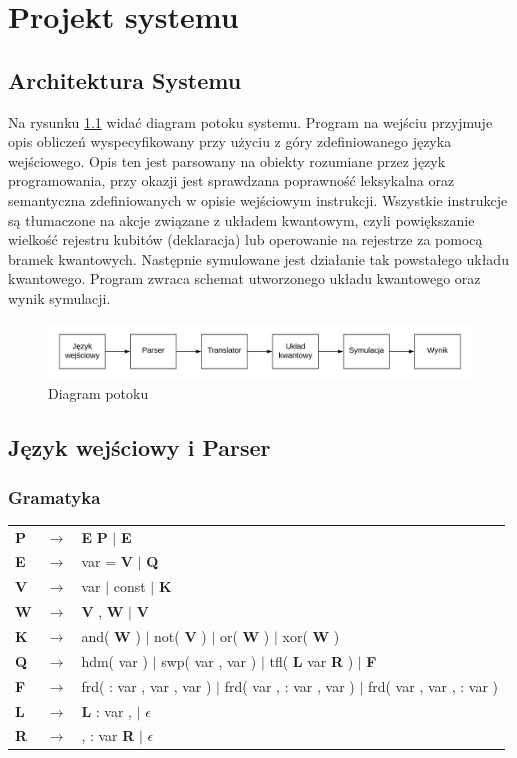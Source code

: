 \chapter{Projekt systemu}
\thispagestyle{chapterBeginStyle}
\label{rozdzial2}

\section{Architektura Systemu}
Na rysunku \ref{fig:potok} widać diagram potoku systemu. Program na wejściu przyjmuje opis obliczeń wyspecyfikowany przy użyciu z góry zdefiniowanego języka wejściowego. Opis ten jest parsowany na obiekty rozumiane przez język programowania, przy okazji jest sprawdzana poprawność leksykalna oraz semantyczna zdefiniowanych w opisie wejściowym instrukcji. Wszystkie instrukcje są tłumaczone na akcje związane z układem kwantowym, czyli powiększanie wielkość rejestru kubitów (deklaracja) lub operowanie na rejestrze za pomocą bramek kwantowych. Następnie symulowane jest działanie tak powstałego układu kwantowego. Program zwraca schemat utworzonego układu kwantowego oraz wynik symulacji.
\begin{figure}[H]
    \includegraphics[width=\linewidth]{systemDiag.png}
    \caption{Diagram potoku}
    \label{fig:potok}
\end{figure}
\section{Język wejściowy i Parser}
\subsection{Gramatyka}
\begin{tabular}{ l c l } 
    \textbf{P} & $\rightarrow$ & \textbf{E} \textbf{P} $|$ \textbf{E} \\ 
    \textbf{E} & $\rightarrow$ & var = \textbf{V} $|$ \textbf{Q} \\ 
    \textbf{V} & $\rightarrow$ & var $|$ const $|$ \textbf{K} \\ 
    \textbf{W} & $\rightarrow$ & \textbf{V} , \textbf{W} $|$ \textbf{V} \\
    \textbf{K} & $\rightarrow$ & and( \textbf{W} ) $|$ not( \textbf{V} ) $|$ or( \textbf{W} ) $|$ xor( \textbf{W} )\\
    \textbf{Q} & $\rightarrow$ & hdm( var ) $|$ swp( var , var ) $|$ tfl( \textbf{L} var \textbf{R} ) $|$ \textbf{F}\\
    \textbf{F} & $\rightarrow$ & frd( : var , var , var ) $|$ frd( var , : var , var ) $|$ frd( var , var , : var )\\
    \textbf{L} & $\rightarrow$ & \textbf{L} : var , $|$ $\epsilon$\\
    \textbf{R} & $\rightarrow$ & , : var \textbf{R} $|$ $\epsilon$\\
\end{tabular}
